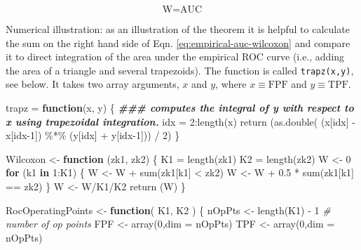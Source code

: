 \documentclass[
]{book}
\newenvironment{Shaded}{\begin{snugshade}}{\end{snugshade}}
\newcommand{\AttributeTok}[1]{\textcolor[rgb]{0.77,0.63,0.00}{#1}}
\newcommand{\CommentTok}[1]{\textcolor[rgb]{0.56,0.35,0.01}{\textit{#1}}}
\newcommand{\ControlFlowTok}[1]{\textcolor[rgb]{0.13,0.29,0.53}{\textbf{#1}}}
\newcommand{\DecValTok}[1]{\textcolor[rgb]{0.00,0.00,0.81}{#1}}
\newcommand{\DocumentationTok}[1]{\textcolor[rgb]{0.56,0.35,0.01}{\textbf{\textit{#1}}}}
\newcommand{\FloatTok}[1]{\textcolor[rgb]{0.00,0.00,0.81}{#1}}
\newcommand{\FunctionTok}[1]{\textcolor[rgb]{0.00,0.00,0.00}{#1}}
\newcommand{\NormalTok}[1]{#1}
\newcommand{\OtherTok}[1]{\textcolor[rgb]{0.56,0.35,0.01}{#1}}
\newcommand{\SpecialCharTok}[1]{\textcolor[rgb]{0.00,0.00,0.00}{#1}}
\begin{document}
\begin{equation}
\text{W} = \text{AUC}
\label{eq:empirical-auc-bamber-theorem}
\end{equation}

Numerical illustration: as an illustration of the theorem it is helpful to calculate the sum on the right hand side of Eqn. \eqref{eq:empirical-auc-wilcoxon} and compare it to direct integration of the area under the empirical ROC curve (i.e., adding the area of a triangle and several trapezoids). The function is called \texttt{trapz(x,y)}, see below. It takes two array arguments, \(x\) and \(y\), where \(x \equiv \text{FPF}\) and \(y \equiv \text{TPF}\).

\begin{Shaded}
\begin{Highlighting}[]
\NormalTok{trapz }\OtherTok{=} \ControlFlowTok{function}\NormalTok{(x, y)}
\NormalTok{\{ }\DocumentationTok{\#\#\# computes the integral of y with respect to x using trapezoidal integration.}
\NormalTok{  idx }\OtherTok{=} \DecValTok{2}\SpecialCharTok{:}\FunctionTok{length}\NormalTok{(x)}
  \FunctionTok{return}\NormalTok{ (}\FunctionTok{as.double}\NormalTok{( (x[idx] }\SpecialCharTok{{-}}\NormalTok{ x[idx}\DecValTok{{-}1}\NormalTok{]) }\SpecialCharTok{\%*\%}\NormalTok{ (y[idx] }\SpecialCharTok{+}\NormalTok{ y[idx}\DecValTok{{-}1}\NormalTok{])) }\SpecialCharTok{/} \DecValTok{2}\NormalTok{)}
\NormalTok{\}}


\NormalTok{Wilcoxon }\OtherTok{\textless{}{-}} \ControlFlowTok{function}\NormalTok{ (zk1, zk2)}
\NormalTok{\{}
\NormalTok{  K1 }\OtherTok{=} \FunctionTok{length}\NormalTok{(zk1)}
\NormalTok{  K2 }\OtherTok{=} \FunctionTok{length}\NormalTok{(zk2)}
\NormalTok{  W }\OtherTok{\textless{}{-}} \DecValTok{0}
  \ControlFlowTok{for}\NormalTok{ (k1 }\ControlFlowTok{in} \DecValTok{1}\SpecialCharTok{:}\NormalTok{K1) \{}
\NormalTok{    W }\OtherTok{\textless{}{-}}\NormalTok{ W }\SpecialCharTok{+} \FunctionTok{sum}\NormalTok{(zk1[k1] }\SpecialCharTok{\textless{}}\NormalTok{ zk2)}
\NormalTok{    W }\OtherTok{\textless{}{-}}\NormalTok{ W }\SpecialCharTok{+} \FloatTok{0.5} \SpecialCharTok{*} \FunctionTok{sum}\NormalTok{(zk1[k1] }\SpecialCharTok{==}\NormalTok{ zk2)}
\NormalTok{  \}}
\NormalTok{  W }\OtherTok{\textless{}{-}}\NormalTok{ W}\SpecialCharTok{/}\NormalTok{K1}\SpecialCharTok{/}\NormalTok{K2}
  \FunctionTok{return}\NormalTok{ (W)}
\NormalTok{\}}


\NormalTok{RocOperatingPoints }\OtherTok{\textless{}{-}} \ControlFlowTok{function}\NormalTok{( K1, K2 ) \{}
\NormalTok{  nOpPts }\OtherTok{\textless{}{-}} \FunctionTok{length}\NormalTok{(K1) }\SpecialCharTok{{-}} \DecValTok{1} \CommentTok{\# number of op points}
\NormalTok{  FPF }\OtherTok{\textless{}{-}} \FunctionTok{array}\NormalTok{(}\DecValTok{0}\NormalTok{,}\AttributeTok{dim =}\NormalTok{ nOpPts)}
\NormalTok{  TPF }\OtherTok{\textless{}{-}} \FunctionTok{array}\NormalTok{(}\DecValTok{0}\NormalTok{,}\AttributeTok{dim =}\NormalTok{ nOpPts)}
   

\end{Highlighting}
\end{Shaded}
\end{document}
